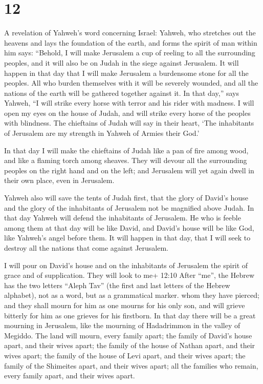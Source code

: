 \hypertarget{section-11}{%
\section{12}\label{section-11}}

 A revelation of Yahweh's word concerning Israel: Yahweh,
who stretches out the heavens and lays the foundation of the earth, and
forms the spirit of man within him says:  ``Behold, I will
make Jerusalem a cup of reeling to all the surrounding peoples, and it
will also be on Judah in the siege against Jerusalem.  It
will happen in that day that I will make Jerusalem a burdensome stone
for all the peoples. All who burden themselves with it will be severely
wounded, and all the nations of the earth will be gathered together
against it.  In that day,'' says Yahweh, ``I will strike
every horse with terror and his rider with madness. I will open my eyes
on the house of Judah, and will strike every horse of the peoples with
blindness.  The chieftains of Judah will say in their heart,
`The inhabitants of Jerusalem are my strength in Yahweh of Armies their
God.'

 In that day I will make the chieftains of Judah like a pan
of fire among wood, and like a flaming torch among sheaves. They will
devour all the surrounding peoples on the right hand and on the left;
and Jerusalem will yet again dwell in their own place, even in
Jerusalem.

 Yahweh also will save the tents of Judah first, that the
glory of David's house and the glory of the inhabitants of Jerusalem not
be magnified above Judah.  In that day Yahweh will defend
the inhabitants of Jerusalem. He who is feeble among them at that day
will be like David, and David's house will be like God, like Yahweh's
angel before them.  It will happen in that day, that I will
seek to destroy all the nations that come against Jerusalem.

 I will pour on David's house and on the inhabitants of
Jerusalem the spirit of grace and of supplication. They will look to me+
12:10 After ``me'', the Hebrew has the two letters ``Aleph Tav'' (the
first and last letters of the Hebrew alphabet), not as a word, but as a
grammatical marker. whom they have pierced; and they shall mourn for him
as one mourns for his only son, and will grieve bitterly for him as one
grieves for his firstborn.  In that day there will be a
great mourning in Jerusalem, like the mourning of Hadadrimmon in the
valley of Megiddo.  The land will mourn, every family
apart; the family of David's house apart, and their wives apart; the
family of the house of Nathan apart, and their wives apart;
 the family of the house of Levi apart, and their wives
apart; the family of the Shimeites apart, and their wives apart;
 all the families who remain, every family apart, and their
wives apart.

